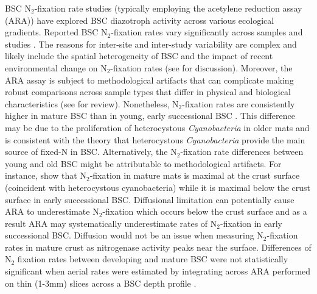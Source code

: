 BSC N$_{2}$-fixation rate studies (typically employing the acetylene reduction assay
(ARA)) have explored BSC diazotroph activity across various ecological
gradients. Reported BSC N$_{2}$-fixation rates vary significantly across samples
and studies \citep{Evans_2001}.  The reasons for inter-site and inter-study
variability are complex and likely include the spatial heterogeneity of BSC
\citep{Evans_2001} and the impact of recent environmental change on
N$_{2}$-fixation rates (see \citet{Belnap_2001} for discussion).  Moreover, the ARA
assay is subject to methodological artifacts that can complicate making robust
comparisons across sample types that differ in physical and biological
characteristics (see \citet{Belnap_2001} for review). Nonetheless,
N$_{2}$-fixation rates are consistently higher in mature BSC than in young,
early successional BSC \citep{Belnap_2002, 14766579}. This difference may be
due to the proliferation of heterocystous \textit{Cyanobacteria} in older mats
and is consistent with the theory that heterocystous \textit{Cyanobacteria} 
provide the main source of fixed-N in BSC. Alternatively, the N$_{2}$-fixation rate
differences between young and old BSC might be attributable to methodological
artifacts.  For instance, \citet{15643930} show that N$_{2}$-fixation in mature
mats is maximal at the crust surface (coincident with heterocystous
cyanobacteria) while it is maximal below the crust surface in early
successional BSC.  Diffusional limitation can potentially cause ARA to
underestimate N$_{2}$-fixation which occurs below the crust surface and as a
result ARA may systematically underestimate rates of N$_{2}$-fixation in early
successional BSC.  Diffusion would not be an issue when measuring
N$_{2}$-fixation rates in mature crust as nitrogenase activity peaks near the
surface.  Differences of N$_{2}$ fixation rates between developing and mature BSC
were not statistically significant when aerial rates were estimated by
integrating across ARA performed on thin (1-3mm) slices across a BSC depth
profile \citet{15643930}.

